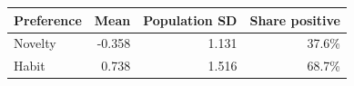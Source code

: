 \begin{tabular}{lrrr}\toprule
Preference & Mean & Population SD & Share positive\\\midrule
Novelty & -0.358 & 1.131 & 37.6\%\\
Habit & 0.738 & 1.516 & 68.7\%\\\bottomrule\end{tabular}

